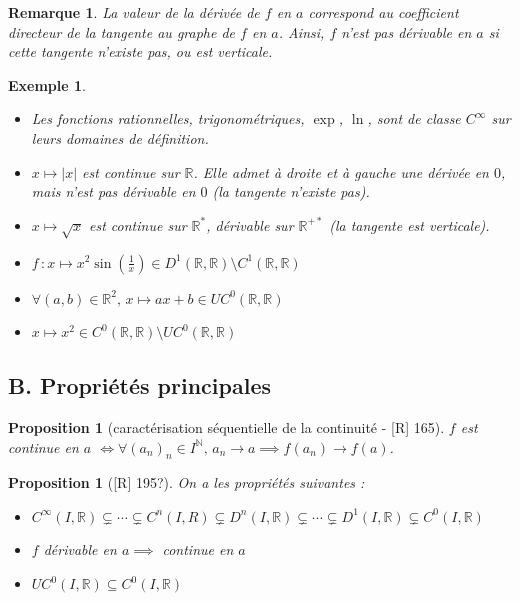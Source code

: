 \documentclass[10pt, a4paper, parskip=full, twoside, twocolumn]{report}
\newtheorem{proposition}[definition]{Proposition}
\newtheorem{example}[definition]{Exemple}
\newtheorem{remark}[definition]{Remarque}
\newcommand{\IN}{\mathbb{N}}
\newcommand{\IR}{\mathbb{R}}
\begin{document}
\begin{remark}
	La valeur de la dérivée de $f$ en $a$ correspond au coefficient directeur de la tangente au graphe de $f$ en $a$. Ainsi, $f$ n'est pas dérivable en $a$ si cette tangente n'existe pas, ou est verticale.
\end{remark}

\begin{example}
	\begin{itemize}
		\item Les fonctions rationnelles, trigonométriques, $\exp$, $\ln$, sont de classe $C^{\infty}$ sur leurs domaines de définition.
		\item $x\mapsto \vert x\vert$ est continue sur $\IR$. Elle admet à droite et à gauche une dérivée en $0$, mais n'est pas dérivable en $0$ (la tangente n'existe pas).
		\item $x\mapsto \sqrt{x}$ est continue sur $\IR^*$, dérivable sur $\IR^{+*}$ (la tangente est verticale).
		\item $f\,\colon x\mapsto x^2\sin(\frac{1}{x})\in D^1(\IR,\IR) \setminus C^1(\IR,\IR)$
		\item $\forall (a,b)\in \IR^2,\, x\mapsto ax+b\in UC^0(\IR,\IR)$
		\item $x\mapsto x^2 \in C^0(\IR,\IR) \setminus UC^0(\IR,\IR)$
	\end{itemize}
\end{example}

\subsection*{B. Propriétés principales}

\begin{proposition}[caractérisation séquentielle de la continuité - \textnormal{[R] 165}]
	$f$ est continue en $a$ $\iff\forall \left(a_n\right)_n \in I^{\IN},\, a_n\to a\implies f(a_n)\to f(a)$.
\end{proposition}

\begin{proposition}[\textnormal{[R] 195?}]
	On a les propriétés suivantes :
	\begin{itemize}
		\item $C^{\infty}(I,\IR) \subsetneq \cdots \subsetneq C^n(I,R) \subsetneq D^n(I,\IR)\subsetneq \cdots \subsetneq D^1(I,\IR) \subsetneq C^0(I,\IR)$
		\item $f$ dérivable en $a \implies$ continue en $a$
		\item $UC^0(I,\IR)\subseteq C^0(I,\IR)$
	\end{itemize}
\end{proposition}
\end{document}
